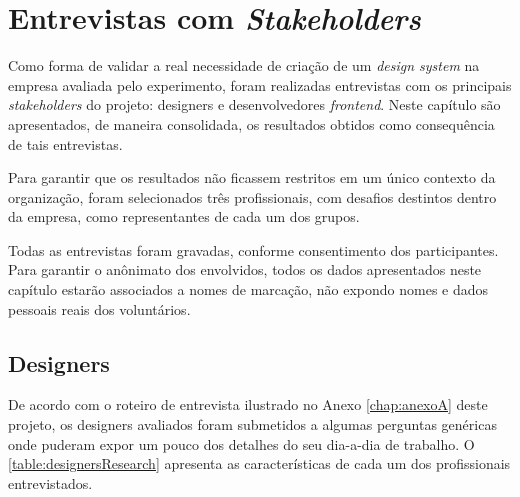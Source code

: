 
\chapter{Entrevistas com \textit{Stakeholders}}
\label{chap:entrevistas}


Como forma de validar a real necessidade de criação de um \textit{design system} na empresa avaliada pelo experimento, foram realizadas entrevistas com os principais \textit{stakeholders} do projeto: designers e desenvolvedores \textit{frontend}. Neste capítulo são apresentados, de maneira consolidada, os resultados obtidos como consequência de tais entrevistas.

Para garantir que os resultados não ficassem restritos em um único contexto da organização, foram selecionados três profissionais, com desafios destintos dentro da empresa, como representantes de cada um dos grupos.

Todas as entrevistas foram gravadas, conforme consentimento dos participantes. Para garantir o anônimato dos envolvidos, todos os dados apresentados neste capítulo estarão associados a nomes de marcação, não expondo nomes e dados pessoais reais dos voluntários.

\section{Designers}
\label{sec:entrevistasDesigners}

De acordo com o roteiro de entrevista ilustrado no Anexo \ref{chap:anexoA} deste projeto, os designers avaliados foram submetidos a algumas perguntas genéricas onde puderam expor um pouco dos detalhes do seu dia-a-dia de trabalho. O \autoref{table:designersResearch} apresenta as características de cada um dos profissionais entrevistados.

